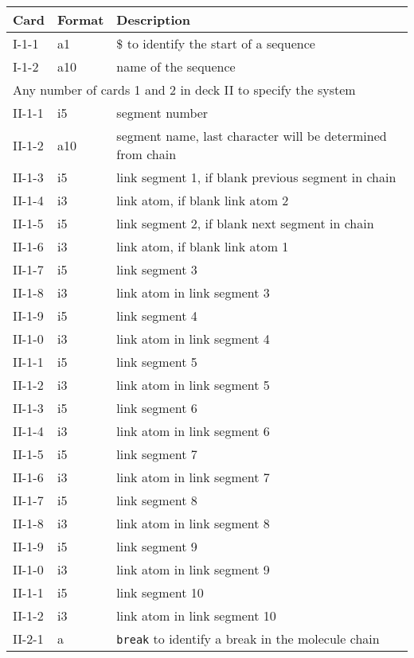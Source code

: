\begin{table}[htbp]
\begin{center}
\begin{tabular*}{150mm}{p{15mm}p{12mm}l}
\hline\hline
Card & Format & Description \\ \hline
I-1-1  & a1     & \$ to identify the start of a sequence \\ %
I-1-2  & a10    & name of the sequence\\
\multicolumn{3}{l}{Any number of cards 1 and 2 in deck II to specify the system} \\
II-1-1 & i5     & segment number\\
II-1-2 & a10    & segment name, last character will be determined from chain\\
II-1-3 & i5     & link segment 1, if blank previous segment in chain\\
II-1-4 & i3     & link atom, if blank link atom 2\\
II-1-5 & i5     & link segment 2, if blank next segment in chain\\
II-1-6 & i3     & link atom, if blank link atom 1\\
II-1-7 & i5     & link segment 3\\
II-1-8 & i3     & link atom in link segment 3\\
II-1-9 & i5     & link segment 4\\
II-1-0 & i3     & link atom in link segment 4\\
II-1-1 & i5     & link segment 5\\
II-1-2 & i3     & link atom in link segment 5\\
II-1-3 & i5     & link segment 6\\
II-1-4 & i3     & link atom in link segment 6\\
II-1-5 & i5     & link segment 7\\
II-1-6 & i3     & link atom in link segment 7\\
II-1-7 & i5     & link segment 8\\
II-1-8 & i3     & link atom in link segment 8\\
II-1-9 & i5     & link segment 9\\
II-1-0 & i3     & link atom in link segment 9\\
II-1-1 & i5     & link segment 10\\
II-1-2 & i3     & link atom in link segment 10\\
II-2-1 & a      & \verb+break+ to identify a break in the molecule chain\\

\end{tabular*}
\end{center}
\end{table}
